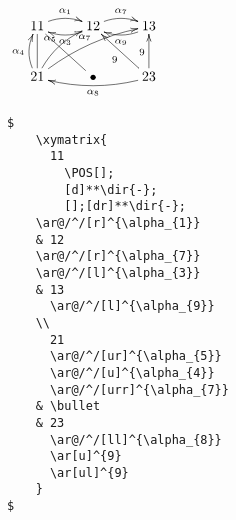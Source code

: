 \documentclass[a4paper,10pt,landscape]{article}
\theoremstyle{definition}
\theoremstyle{remark}
\begin{document}
$
	\xymatrix{
	  11
		\POS[];
		[d]**\dir{-};
		[];[dr]**\dir{-};
	\ar@/^/[r]^{\alpha_{1}} 
	& 12
	\ar@/^/[r]^{\alpha_{7}} 
	\ar@/^/[l]^{\alpha_{3}} 
	& 13
	  \ar@/^/[l]^{\alpha_{9}} 
	\\
	  21
	  \ar@/^/[ur]^{\alpha_{5}}
	  \ar@/^/[u]^{\alpha_{4}}
	  \ar@/^/[urr]^{\alpha_{7}}
	& \bullet
	& 23
	  \ar@/^/[ll]^{\alpha_{8}}
	  \ar[u]^{9}
	  \ar[ul]^{9}
	}
$
\begin{verbatim}
$
	\xymatrix{
	  11
		\POS[];
		[d]**\dir{-};
		[];[dr]**\dir{-};
	\ar@/^/[r]^{\alpha_{1}} 
	& 12
	\ar@/^/[r]^{\alpha_{7}} 
	\ar@/^/[l]^{\alpha_{3}} 
	& 13
	  \ar@/^/[l]^{\alpha_{9}} 
	\\
	  21
	  \ar@/^/[ur]^{\alpha_{5}}
	  \ar@/^/[u]^{\alpha_{4}}
	  \ar@/^/[urr]^{\alpha_{7}}
	& \bullet
	& 23
	  \ar@/^/[ll]^{\alpha_{8}}
	  \ar[u]^{9}
	  \ar[ul]^{9}
	}
$
\end{verbatim}




\end{document}
